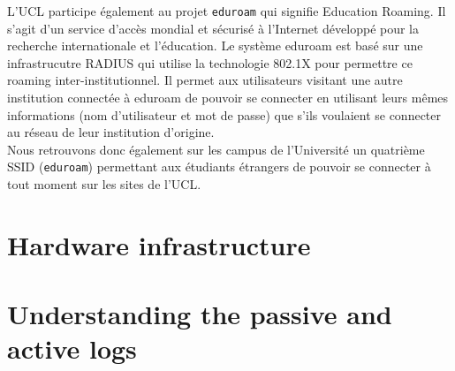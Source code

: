 L'UCL participe également au projet \texttt{eduroam} qui signifie Education Roaming. Il s'agit d'un service d'accès mondial et sécurisé à l'Internet développé pour la recherche internationale et l'éducation. Le système eduroam est basé sur une infrastrucutre RADIUS qui utilise la technologie 802.1X pour permettre ce roaming inter-institutionnel. Il permet aux utilisateurs visitant une autre institution connectée à eduroam de pouvoir se connecter en utilisant leurs mêmes informations (nom d'utilisateur et mot de passe) que s'ils voulaient se connecter au réseau de leur institution d'origine.\\
Nous retrouvons donc également sur les campus de l'Université un quatrième SSID (\texttt{eduroam}) permettant aux étudiants étrangers de pouvoir se connecter à tout moment sur les sites de l'UCL.


\section{Hardware infrastructure}


\section{Understanding the passive and active logs}